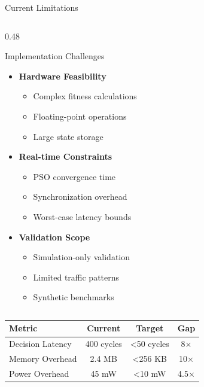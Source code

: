 \documentclass[10pt,aspectratio=169]{beamer}
\begin{document}
\begin{frame}{Current Limitations}
\begin{columns}[T]
        \begin{column}{0.48\textwidth}
            \begin{exampleblock}{Implementation Challenges}
                \begin{itemize}
                    \item \textbf{Hardware Feasibility}
                    \begin{itemize}
                        \item Complex fitness calculations
                        \item Floating-point operations
                        \item Large state storage
                    \end{itemize}
                    \item \textbf{Real-time Constraints}
                    \begin{itemize}
                        \item PSO convergence time
                        \item Synchronization overhead
                        \item Worst-case latency bounds
                    \end{itemize}
                    \item \textbf{Validation Scope}
                    \begin{itemize}
                        \item Simulation-only validation
                        \item Limited traffic patterns
                        \item Synthetic benchmarks
                    \end{itemize}
                \end{itemize}
            \end{exampleblock}
        \end{column}
    \end{columns}
    
    \begin{table}[h]
        \centering
        \small
        \begin{tabular}{|l|c|c|c|}
            \hline
            \textbf{Metric} & \textbf{Current} & \textbf{Target} & \textbf{Gap} \\
            \hline
            Decision Latency & 400 cycles & <50 cycles & 8× \\
            Memory Overhead & 2.4 MB & <256 KB & 10× \\
            Power Overhead & 45 mW & <10 mW & 4.5× \\
            \hline
        \end{tabular}
    \end{table}
\end{frame}
\end{document}
